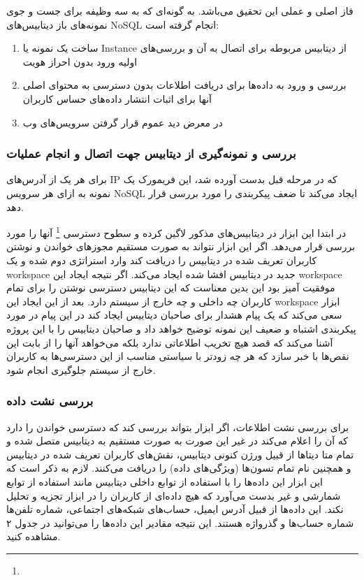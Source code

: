 \documentclass[10pt, a4paper]{article}
\begin{document}
فاز اصلی و عملی این تحقیق می‌باشد. به گونه‌ای که به سه وظیفه برای جست و جوی
نمونه‌های باز دیتابیس‌های NoSQL انجام گرفته است:

\begin{enumerate}
    \item ساخت یک نمونه یا Instance از دیتابیس مربوطه برای اتصال به آن و
    بررسی‌های اولیه ورود بدون احراز هویت
    \item بررسی و ورود به داده‌ها برای دریافت اطلاعات بدون دسترسی به محتوای اصلی
    آنها برای اثبات انتشار داده‌های حساس کاربران
    \item در معرض دید عموم قرار گرفتن سرویس‌های وب
\end{enumerate}


\subsubsection*{بررسی و نمونه‌گیری از دیتابیس جهت اتصال و انجام عملیات}

برای هر یک از آدرس‌های IP که در مرحله قبل بدست آورده شد، این فریمورک یک نمونه به
ازای هر سرویس NoSQL ایجاد می‌کند تا ضعف پیکربندی را مورد بررسی قرار دهد.

در ابتدا این ابزار در دیتابیس‌های مذکور لاگین کرده و سطوح دسترسی
\footnote{} آنها را مورد بررسی قرار می‌دهد. اگر این ابزار
نتواند به صورت مستقیم مجوز‌های خواندن و نوشتن کاربران تعریف شده در دیتابیس را
دریافت کند وارد استراتژی دوم شده و یک workspace جدید در دیتابیس افشا شده ایجاد
می‌کند. اگر نتیجه ایجاد این workspace موفقیت آمیز بود این بدین معناست که این
دیتابیس دسترسی نوشتن را برای تمام کاربران چه داخلی و چه خارج از سیستم دارد. بعد
از این ایجاد این workspace ابزار سعی می‌کند که یک پیام هشدار برای صاحبان دیتابیس
ایجاد کند در این پیام در مورد پیکربندی اشتباه و ضعیف این نمونه توضیح خواهد داد و
صاحبان دیتابیس را با این پروژه آشنا می‌کند که قصد هیچ تخریب اطلاعاتی ندارد بلکه
می‌خواهد آنها را از بابت این نقص‌ها با خبر سازد که هر چه زودتر با سیاستی مناسب
از این دسترسی‌ها به کاربران خارج از سیستم جلوگیری انجام شود.

\subsubsection*{بررسی نشت داده}

برای بررسی نشت اطلاعات، اگر ابزار بتواند بررسی کند که دسترسی خواندن را دارد که
آن را اعلام می‌کند در غیر این صورت به صورت مستقیم به دیتابیس متصل شده و تمام متا
دیتا‌ها از قبیل ورژن کنونی دیتابیس، نقش‌های کاربران تعریف شده در دیتابیس و
همچنین نام تمام تسون‌ها (ویژگی‌های داده) را دریافت می‌کنند. لازم به ذکر است که
این ابزار این داده‌ها را با استفاده از توابع داخلی دیتابیس مانند استفاده از
 توابع شمارشی و غیر بدست می‌آورد که هیچ داده‌ای از کاربران
را در ابزار تجزیه و تحلیل نکند. این داده‌ها از قبیل آدرس ایمیل، حساب‌های
شبکه‌های اجتماعی، شماره تلفن‌ها شماره حساب‌ها و گذرواژه هستند. این نتیجه مقادیر
این داده‌ها را می‌توانید در جدول ۲ مشاهده کنید.
\end{document}

